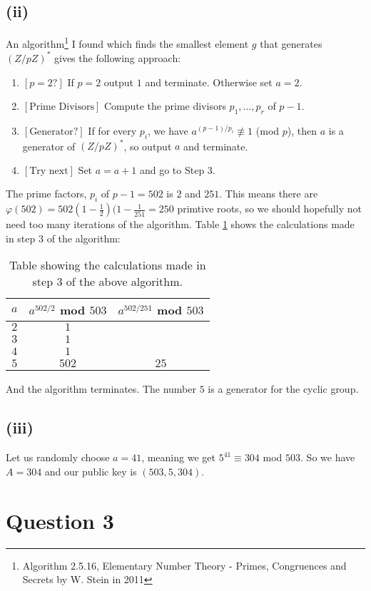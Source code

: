 \documentclass[a4paper, fleqn]{article}
\begin{document}
\subsection{(ii)}
An algorithm\footnote{Algorithm 2.5.16, Elementary Number Theory - Primes, Congruences and Secrets by W. Stein in 2011} I found which finds the smallest element $g$ that generates $(Z/pZ)^*$ gives the following approach:
\begin{enumerate}
  \item  $[p = 2?]$ If $p=2$ output $1$ and terminate. Otherwise set $a=2$.
  \item  $[\mbox{Prime Divisors}]$ Compute the prime divisors $p_1,\ldots, p_r$ of $p-1$.
  \item  $[\mbox{Generator?}]$ If for every $p_i$, we have $a^{(p-1)/p_i} \not\equiv 1$ (mod $p$), then $a$ is a generator of $(Z/pZ)^*$, so output $a$ and terminate.
  \item  $[\mbox{Try next}]$ Set $a=a+1$ and go to Step 3.
\end{enumerate}
The prime factors, $p_i$ of $p-1=502$ is $2$ and $251$. This means there are $\varphi(502)=502(1-\frac{1}{2})(1-\frac{1}{251}=250$ primtive roots, so we should hopefully not need too many iterations of the algorithm. Table \ref{tab1} shows the calculations made in step $3$ of the algorithm:
\begin{table}[H]
  \centering
  \begin{tabular}{|c|c|c|}
  \hline
  $a$ & $a^{502/2}$ mod $503$ & $a^{502/251}$ mod $503$ \\
  \hline
  $2$ & $1$ & \\
  \hline
  $3$ & $1$ & \\
  \hline
  $4$ & $1$ & \\
  \hline
  $5$ & $502$ & $25$ \\
  \hline
  \end{tabular}
  \caption{Table showing the calculations made in step $3$ of the above algorithm.}
  \label{tab1}
\end{table}
And the algorithm terminates. The number $5$ is a generator for the cyclic group.

\subsection{(iii)}
Let us randomly choose $a=41$, meaning we get $5^{41} \equiv 304$ mod $503$. So we have $A=304$ and our public key is $(503, 5, 304)$.

\section{Question 3}
\end{document}
